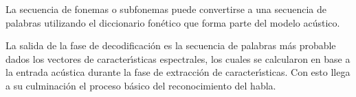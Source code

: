 La secuencia de fonemas o subfonemas puede convertirse a una secuencia de palabras utilizando el diccionario
fon\'etico que forma parte del modelo ac\'ustico.

La salida de la fase de decodificaci\'on es la secuencia de palabras m\'as probable dados los vectores
de caracter{\'\i}sticas espectrales, los cuales se calcularon en base a la entrada ac\'ustica durante
la fase de extracci\'on de caracter{\'\i}sticas. Con esto llega a su culminaci\'on el proceso b\'asico
del reconocimiento del habla.